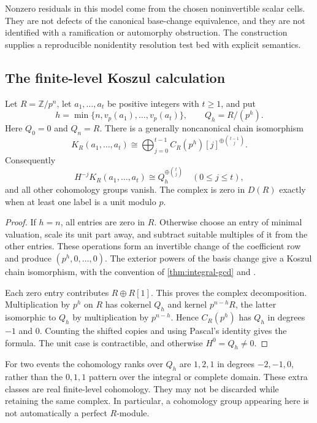 \begin{remark}
Nonzero residuals in this model come from the chosen noninvertible scalar cells. They are not defects of the canonical base-change equivalence, and they are not identified with a ramification or automorphy obstruction. The construction supplies a reproducible nonidentity resolution test bed with explicit semantics.
\end{remark}

\subsection{The finite-level Koszul calculation}

\begin{theorem}\label{thm:prime-power-koszul}
Let $R=\mathbb Z/p^n$, let $a_1,\ldots,a_t$ be positive integers with $t\geq1$, and put
\[
 h=\min\{n,v_p(a_1),\ldots,v_p(a_t)\},\qquad Q_h=R/(p^h).
\]
Here $Q_0=0$ and $Q_n=R$. There is a generally noncanonical chain isomorphism
\[
 K_R(a_1,\ldots,a_t)\cong
 \bigoplus_{j=0}^{t-1}C_R(p^h)[j]^{\oplus\binom{t-1}{j}}.
\]
Consequently
\[
 \boxed{H^{-j}K_R(a_1,\ldots,a_t)\cong Q_h^{\oplus\binom tj}
 \quad(0\leq j\leq t),}
\]
and all other cohomology groups vanish. The complex is zero in $D(R)$ exactly when at least one label is a unit modulo $p$.
\end{theorem}
\begin{proof}
If $h=n$, all entries are zero in $R$. Otherwise choose an entry of minimal valuation, scale its unit part away, and subtract suitable multiples of it from the other entries. These operations form an invertible change of the coefficient row and produce $(p^h,0,\ldots,0)$. The exterior powers of the basis change give a Koszul chain isomorphism, with the convention of \cref{thm:integral-gcd} and \cite{StacksKoszul}.

Each zero entry contributes $R\oplus R[1]$. This proves the complex decomposition. Multiplication by $p^h$ on $R$ has cokernel $Q_h$ and kernel $p^{n-h}R$, the latter isomorphic to $Q_h$ by multiplication by $p^{n-h}$. Hence $C_R(p^h)$ has $Q_h$ in degrees $-1$ and $0$. Counting the shifted copies and using Pascal's identity gives the formula. The unit case is contractible, and otherwise $H^0=Q_h\ne0$.
\end{proof}

For two events the cohomology ranks over $Q_h$ are $1,2,1$ in degrees $-2,-1,0$, rather than the $0,1,1$ pattern over the integral or complete domain. These extra classes are real finite-level cohomology. They may not be discarded while retaining the same complex. In particular, a cohomology group appearing here is not automatically a perfect $R$-module.

